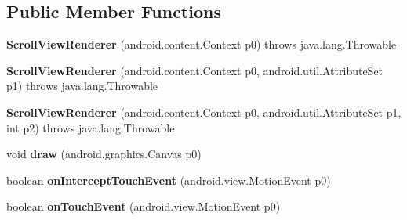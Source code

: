 \subsection*{Public Member Functions}
\begin{DoxyCompactItemize}
\item 
\mbox{\label{classmd5b60ffeb829f638581ab2bb9b1a7f4f3f_1_1ScrollViewRenderer_a02512d520220cf6181e8a53806b72506}} 
{\bfseries Scroll\+View\+Renderer} (android.\+content.\+Context p0)  throws java.\+lang.\+Throwable 	
\item 
\mbox{\label{classmd5b60ffeb829f638581ab2bb9b1a7f4f3f_1_1ScrollViewRenderer_ad686631aae6194ffcd34b7e3a9c0643d}} 
{\bfseries Scroll\+View\+Renderer} (android.\+content.\+Context p0, android.\+util.\+Attribute\+Set p1)  throws java.\+lang.\+Throwable 	
\item 
\mbox{\label{classmd5b60ffeb829f638581ab2bb9b1a7f4f3f_1_1ScrollViewRenderer_a476765090c78d15df5e61c632e53be4f}} 
{\bfseries Scroll\+View\+Renderer} (android.\+content.\+Context p0, android.\+util.\+Attribute\+Set p1, int p2)  throws java.\+lang.\+Throwable 	
\item 
\mbox{\label{classmd5b60ffeb829f638581ab2bb9b1a7f4f3f_1_1ScrollViewRenderer_aae3343e25e199d02c22d1e33b37138a3}} 
void {\bfseries draw} (android.\+graphics.\+Canvas p0)
\item 
\mbox{\label{classmd5b60ffeb829f638581ab2bb9b1a7f4f3f_1_1ScrollViewRenderer_a479edb806c389229f367e7fdf2c58ece}} 
boolean {\bfseries on\+Intercept\+Touch\+Event} (android.\+view.\+Motion\+Event p0)
\item 
\mbox{\label{classmd5b60ffeb829f638581ab2bb9b1a7f4f3f_1_1ScrollViewRenderer_a4581815eede4c1676de1f11fc07cb9c4}} 
boolean {\bfseries on\+Touch\+Event} (android.\+view.\+Motion\+Event p0)
\item 
\mbox{\label{classmd5b60ffeb829f638581ab2bb9b1a7f4f3f_1_1ScrollViewRenderer_aa4409732485b82d3c52bafb9a6b9a8e0}} 

\end{DoxyCompactItemize}
